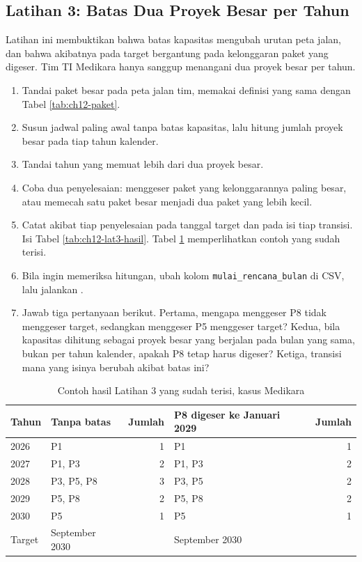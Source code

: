 \subsection*{Latihan 3: Batas Dua Proyek Besar per Tahun}

Latihan ini membuktikan bahwa batas kapasitas mengubah urutan peta jalan, dan
bahwa akibatnya pada target bergantung pada kelonggaran paket yang digeser.
Tim TI Medikara hanya sanggup menangani dua proyek besar per tahun.

\begin{enumerate}
  \item Tandai paket besar pada peta jalan tim, memakai definisi yang sama
        dengan Tabel \ref{tab:ch12-paket}.
  \item Susun jadwal paling awal tanpa batas kapasitas, lalu hitung jumlah
        proyek besar pada tiap tahun kalender.
  \item Tandai tahun yang memuat lebih dari dua proyek besar.
  \item Coba dua penyelesaian: menggeser paket yang kelonggarannya paling
        besar, atau memecah satu paket besar menjadi dua paket yang lebih
        kecil.
  \item Catat akibat tiap penyelesaian pada tanggal target dan pada isi tiap
        transisi. Isi Tabel \ref{tab:ch12-lat3-hasil}. Tabel
        \ref{tab:ch12-lat3-contoh} memperlihatkan contoh yang sudah terisi.
  \item Bila ingin memeriksa hitungan, ubah kolom
        \texttt{mulai\_rencana\_bulan} di CSV, lalu jalankan
        .
  \item Jawab tiga pertanyaan berikut. Pertama, mengapa menggeser P8 tidak
        menggeser target, sedangkan menggeser P5 menggeser target? Kedua, bila
        kapasitas dihitung sebagai proyek besar yang berjalan pada bulan yang
        sama, bukan per tahun kalender, apakah P8 tetap harus digeser? Ketiga,
        transisi mana yang isinya berubah akibat batas ini?
\end{enumerate}

\begin{table}[!htb]
  \centering
  \caption{Contoh hasil Latihan 3 yang sudah terisi, kasus Medikara}
  \label{tab:ch12-lat3-contoh}
  \begin{tabularx}{\textwidth}{l>{\raggedright\arraybackslash}Xr
                               >{\raggedright\arraybackslash}Xr}
    \hline
    \textbf{Tahun} & \textbf{Tanpa batas} & \textbf{Jumlah} &
      \textbf{P8 digeser ke Januari 2029} & \textbf{Jumlah} \\
    \hline
    2026 & P1 & 1 & P1 & 1 \\
    \hline
    2027 & P1, P3 & 2 & P1, P3 & 2 \\
    \hline
    2028 & P3, P5, P8 & 3 & P3, P5 & 2 \\
    \hline
    2029 & P5, P8 & 2 & P5, P8 & 2 \\
    \hline
    2030 & P5 & 1 & P5 & 1 \\
    \hline
    Target & September 2030 & & September 2030 & \\
    \hline
  \end{tabularx}
\end{table}

